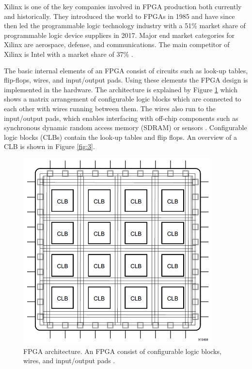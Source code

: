 \documentclass[12pt]{report}
\begin{document}
\par
Xilinx is one of the key companies involved in FPGA production both currently and historically. They introduced the world to FPGAs in 1985 and have since then led the programmable logic technology industry with a 51\% market share of programmable logic device suppliers in 2017. Major end market categories for Xilinx are aerospace, defense, and communications. The main competitor of Xilinx is Intel with a market share of 37\% \citep{XilHist}\citep{XilShare}.
\par
The basic internal elements of an FPGA consist of circuits such as look-up tables, flip-flops, wires, and input/output pads. Using these elements the FPGA design is implemented in the hardware.
The architecture is explained by Figure \ref{fig:2} which shows a matrix arrangement of configurable logic blocks which are connected to each other with wires running between them. The wires also run to the input/output pads, which enables interfacing with off-chip components such as synchronous dynamic random access memory (SDRAM) or sensors \citep{XilFPGAIntro}. Configurable logic blocks (CLBs) contain the look-up tables and flip flops. An overview of a CLB is shown in Figure \ref{fig:3}.

\begin{figure}[h]
    \centering
    \includegraphics[scale=0.55]{figures/basic_fpga.png}
    \caption{FPGA architecture. An FPGA consist of configurable logic blocks, wires, and input/output pads \citep{XilFPGAIntro}.}
    \label{fig:2}
\end{figure}
\end{document}
